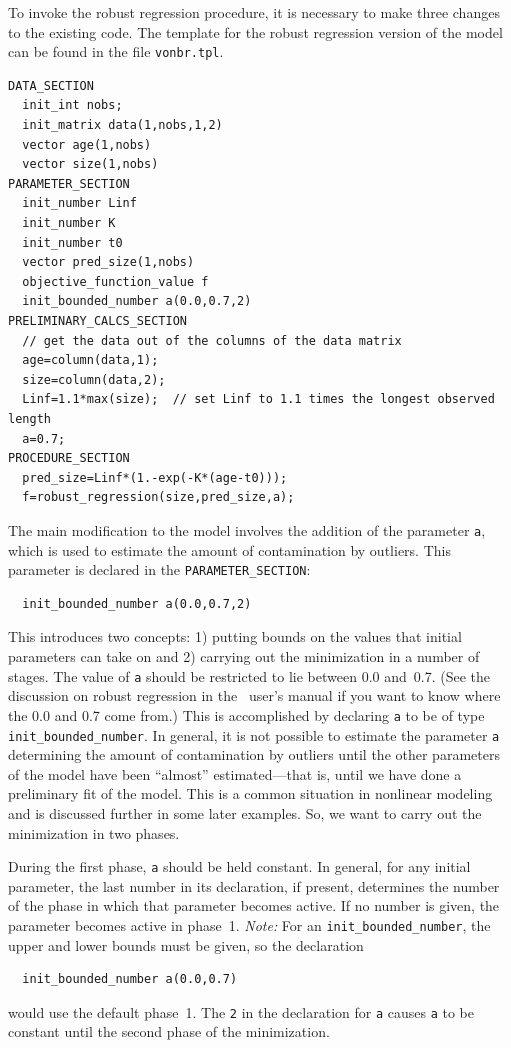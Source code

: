 \documentclass{admbmanual}
\newcommand\PS{\texttt{PARAMETER\_SECTION}}
\begin{document}
To invoke the robust regression procedure, it is necessary to make three changes
to the existing code. The template for the robust regression version of the
model can be found in the file \texttt{vonbr.tpl}.
\begin{lstlisting}
DATA_SECTION
  init_int nobs;
  init_matrix data(1,nobs,1,2)
  vector age(1,nobs)
  vector size(1,nobs)
PARAMETER_SECTION
  init_number Linf
  init_number K
  init_number t0
  vector pred_size(1,nobs)
  objective_function_value f
  init_bounded_number a(0.0,0.7,2)
PRELIMINARY_CALCS_SECTION
  // get the data out of the columns of the data matrix
  age=column(data,1);
  size=column(data,2);
  Linf=1.1*max(size);  // set Linf to 1.1 times the longest observed length
  a=0.7;
PROCEDURE_SECTION
  pred_size=Linf*(1.-exp(-K*(age-t0)));
  f=robust_regression(size,pred_size,a);
\end{lstlisting}
The main modification to the model involves the addition of the parameter
\texttt{a}, which is used to estimate the amount of contamination by outliers.
This parameter is declared in the
\PS:
\begin{lstlisting}
  init_bounded_number a(0.0,0.7,2)
\end{lstlisting}
This introduces two concepts: 1) putting bounds on the values that initial
parameters can take on and 2) carrying out the minimization in a number of
stages. The value of \texttt{a} should be restricted to lie between 0.0 and~0.7.
(See the discussion on robust regression in the \scAD\ user's manual if you want
to know where the 0.0 and 0.7 come from.) This is accomplished by declaring
\texttt{a} to be of type \texttt{init\_bounded\_number}.
In general, it is not possible to estimate the parameter \texttt{a} determining
the amount of contamination by outliers until the other parameters of the model
have been ``almost'' estimated---that is, until we have done a preliminary fit
of the model. This is a common situation in nonlinear modeling and is discussed
further in some later examples. So, we want to carry out the minimization in two
phases.

During the first phase, \texttt{a} should be held constant. In general, for any
initial parameter, the last number in its declaration, if present, determines
the number of the phase in which that parameter becomes active. If no number is
given, the parameter becomes active in phase~1. \textit{Note:} For an
\texttt{init\_bounded\_number}, the upper and lower bounds must be given, so the
declaration
\begin{lstlisting}
  init_bounded_number a(0.0,0.7)
\end{lstlisting}
would use the default phase~1. The \texttt{2} in the declaration for \texttt{a}
causes \texttt{a} to be constant until the second phase of the minimization.
\end{document}
